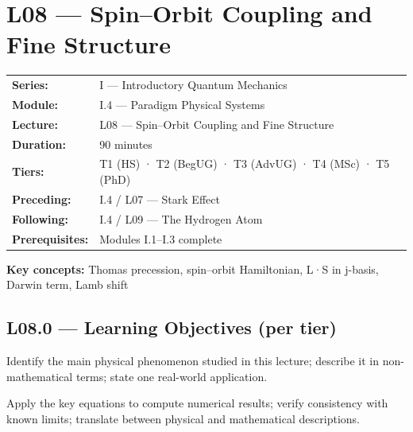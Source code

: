 \renewcommand{\lectureCode}{I.4 / L08}

\section*{L08 — Spin–Orbit Coupling and Fine Structure}
\label{sec:L08}

\begin{tcolorbox}[lecturebox, title={Module I.4 / L08 — Metadata}]
\begin{tabular}{@{}ll@{}}
\textbf{Series:}    & I — Introductory Quantum Mechanics \\
\textbf{Module:}    & I.4 — Paradigm Physical Systems \\
\textbf{Lecture:}   & L08 — Spin–Orbit Coupling and Fine Structure \\
\textbf{Duration:}  & 90 minutes \\
\textbf{Tiers:}     & T1 (HS) · T2 (BegUG) · T3 (AdvUG) · T4 (MSc) · T5 (PhD) \\
\textbf{Preceding:} & I.4 / L07 — Stark Effect \\
\textbf{Following:} & I.4 / L09 — The Hydrogen Atom \\
\textbf{Prerequisites:} & Modules I.1–I.3 complete \\
\end{tabular}

\medskip
\textbf{Key concepts:} Thomas precession, spin–orbit Hamiltonian, L·S in j-basis, Darwin term, Lamb shift
\end{tcolorbox}

\subsection*{L08.0 — Learning Objectives (per tier)}
\label{sec:L08.0}

\quad
Identify the main physical phenomenon studied in this lecture; describe it in
non-mathematical terms; state one real-world application.

\quad
Apply the key equations to compute numerical results; verify consistency with
known limits; translate between physical and mathematical descriptions.

